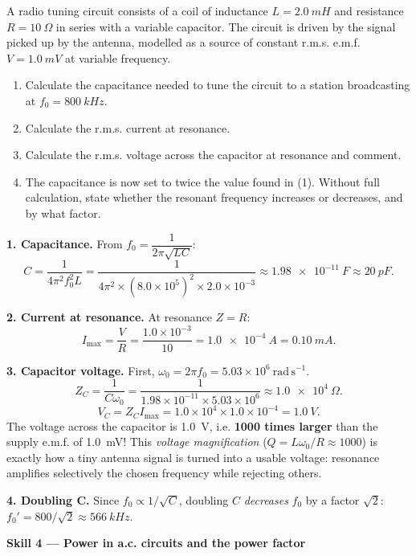 \documentclass[11pt]{article}
\begin{document}
\begin{exoresolu}
A radio tuning circuit consists of a coil of inductance $L = \SI{2.0}{mH}$ and resistance $R = \SI{10}{\Omega}$ in series with a variable capacitor. The circuit is driven by the signal picked up by the antenna, modelled as a source of constant r.m.s. e.m.f. $V = \SI{1.0}{mV}$ at variable frequency.
\begin{enumerate}
\item Calculate the capacitance needed to tune the circuit to a station broadcasting at $f_0 = \SI{800}{kHz}$.
\item Calculate the r.m.s. current at resonance.
\item Calculate the r.m.s. voltage across the capacitor at resonance and comment.
\item The capacitance is now set to twice the value found in (1). Without full calculation, state whether the resonant frequency increases or decreases, and by what factor.
\end{enumerate}
\tcblower
\textbf{1. Capacitance.} From $f_0 = \dfrac{1}{2\pi\sqrt{LC}}$:
\[
C = \frac{1}{4\pi^2 f_0^2 L} = \frac{1}{4\pi^2 \times (8.0\times10^{5})^2 \times 2.0\times10^{-3}}
\approx \SI{1.98e-11}{F} \approx \SI{20}{pF}.
\]

\textbf{2. Current at resonance.} At resonance $Z = R$:
\[
I_{\max} = \frac{V}{R} = \frac{1.0\times10^{-3}}{10} = \SI{1.0e-4}{A} = \SI{0.10}{mA}.
\]

\textbf{3. Capacitor voltage.} First, $\omega_0 = 2\pi f_0 = 5.03\times10^{6}\ \mathrm{rad\,s^{-1}}$.
\[
Z_C = \frac{1}{C\omega_0} = \frac{1}{1.98\times10^{-11}\times 5.03\times10^{6}} \approx \SI{1.0e4}{\Omega}.
\]
\[
V_C = Z_C I_{\max} = 1.0\times10^{4} \times 1.0\times10^{-4} = \SI{1.0}{V}.
\]
The voltage across the capacitor is \SI{1.0}{V}, i.e. \textbf{1000 times larger} than the supply e.m.f. of \SI{1.0}{mV}! This \emph{voltage magnification} ($Q = L\omega_0/R \approx 1000$) is exactly how a tiny antenna signal is turned into a usable voltage: resonance amplifies selectively the chosen frequency while rejecting others.

\textbf{4. Doubling C.} Since $f_0 \propto 1/\sqrt{C}$, doubling $C$ \emph{decreases} $f_0$ by a factor $\sqrt{2}$: $f_0' = 800/\sqrt{2} \approx \SI{566}{kHz}$.
\end{exoresolu}

\textbf{Skill 4 --- Power in a.c. circuits and the power factor}\par
\end{document}
